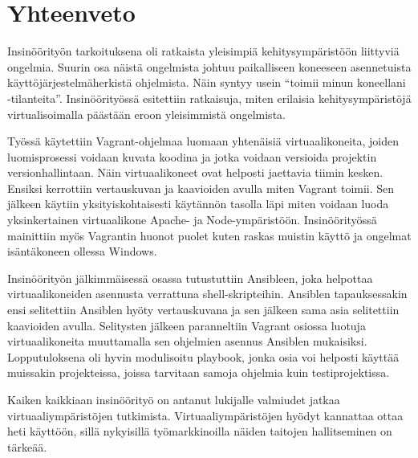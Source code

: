 \chapter{Yhteenveto}

Insinöörityön tarkoituksena oli ratkaista yleisimpiä kehitysympäristöön liittyviä ongelmia. Suurin osa näistä ongelmista johtuu paikalliseen koneeseen asennetuista käyttöjärjestelmäherkistä ohjelmista. Näin syntyy usein \enquote{toimii minun koneellani -tilanteita}. Insinöörityössä esitettiin ratkaisuja, miten erilaisia kehitysympäristöjä virtualisoimalla päästään eroon yleisimmistä ongelmista.

Työssä käytettiin Vagrant-ohjelmaa luomaan yhtenäisiä virtuaalikoneita, joiden luomisprosessi voidaan kuvata koodina ja jotka voidaan versioida projektin versionhallintaan. Näin virtuaalikoneet ovat helposti jaettavia tiimin kesken. Ensiksi kerrottiin vertauskuvan ja kaavioiden avulla miten Vagrant toimii. Sen jälkeen käytiin yksityiskohtaisesti käytännön tasolla läpi miten voidaan luoda yksinkertainen virtuaalikone Apache- ja Node-ympäristöön. Insinöörityössä mainittiin myös Vagrantin huonot puolet kuten raskas muistin käyttö ja ongelmat isäntäkoneen ollessa Windows.

Insinöörityön jälkimmäisessä osassa tutustuttiin Ansibleen, joka helpottaa virtuaalikoneiden asennusta verrattuna shell-skripteihin. Ansiblen tapauksessakin ensi selitettiin Ansiblen hyöty vertauskuvana ja sen jälkeen sama asia selitettiin kaavioiden avulla. Selitysten jälkeen paranneltiin Vagrant osiossa luotuja virtuaalikoneita muuttamalla sen ohjelmien asennus Ansiblen mukaisiksi. Lopputuloksena oli  hyvin modulisoitu playbook, jonka osia voi helposti käyttää muissakin projekteissa, joissa tarvitaan samoja ohjelmia kuin testiprojektissa.

Kaiken kaikkiaan insinöörityö on antanut lukijalle valmiudet jatkaa virtuaaliympäristöjen tutkimista. Virtuaaliympäristöjen hyödyt kannattaa ottaa heti käyttöön, sillä nykyisillä työmarkkinoilla näiden taitojen hallitseminen on tärkeää.